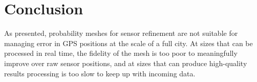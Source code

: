 \section{Conclusion}

As presented, probability meshes for sensor refinement are not suitable for managing error in GPS positions at the scale of a full city. At sizes that can be processed in real time, the fidelity of the mesh is too poor to meaningfully improve over raw sensor positions, and at sizes that can produce high-quality results processing is too slow to keep up with incoming data.


